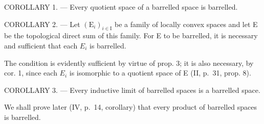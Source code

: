 COROLLARY 1. --- Every quotient space of a barrelled space is barrelled.

COROLLARY 2. --- Let \((\mathrm{E}_{i})_{i\in\mathrm{I}}\) be a family of locally convex spaces and let E be the topological direct sum of this family. For E to be barrelled, it is necessary and sufficient that each \(E_{i}\) is barrelled.

The condition is evidently sufficient by virtue of prop. 3; it is also necessary, by cor. 1, since each \(E_{i}\) is isomorphic to a quotient space of E (II, p.~31, prop. 8).

COROLLARY 3. --- Every inductive limit of barrelled spaces is a barrelled space.

We shall prove later (IV, p.~14, corollary) that every product of barrelled spaces is barrelled.

